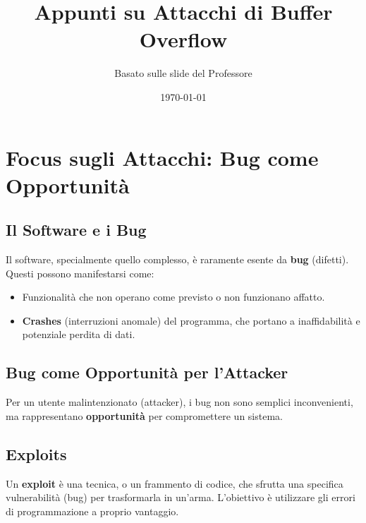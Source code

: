 \documentclass{article}
\title{\textbf{Appunti su Attacchi di Buffer Overflow}}
\author{Basato sulle slide del Professore}
\date{\today}
\begin{document}
\maketitle
\tableofcontents
\newpage

\section{Focus sugli Attacchi: Bug come Opportunità}

\subsection{Il Software e i Bug}
Il software, specialmente quello complesso, è raramente esente da \textbf{bug} (difetti).
Questi possono manifestarsi come:
\begin{itemize}
    \item Funzionalità che non operano come previsto o non funzionano affatto.
    \item \textbf{Crashes} (interruzioni anomale) del programma, che portano a inaffidabilità e potenziale perdita di dati.
\end{itemize}

\subsection{Bug come Opportunità per l'Attacker}
Per un utente malintenzionato (attacker), i bug non sono semplici inconvenienti, ma rappresentano \textbf{opportunità} per compromettere un sistema.

\subsection{Exploits}
Un \textbf{exploit} è una tecnica, o un frammento di codice, che sfrutta una specifica vulnerabilità (bug) per trasformarla in un'arma. L'obiettivo è utilizzare gli errori di programmazione a proprio vantaggio.
\end{document}
